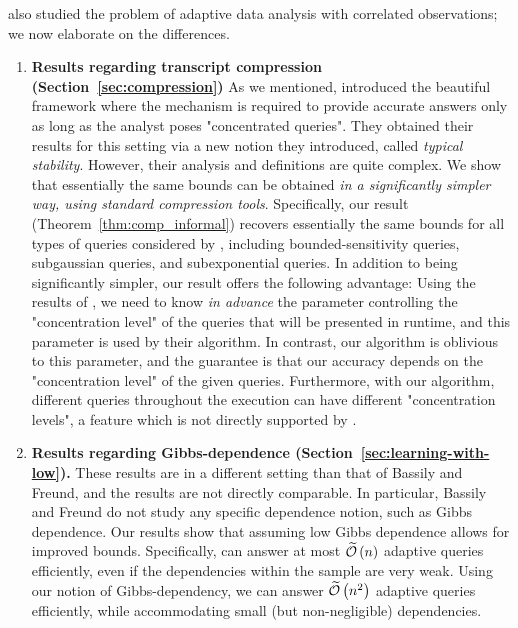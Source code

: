 \documentclass[12pt,a4paper,oneside,onecolumn]{book}
\begin{document}
\citet{DBLP:journals/corr/BassilyF16} also studied the problem of adaptive data analysis with correlated observations; we now elaborate on the differences. 
\begin{enumerate}

\item {\bf Results regarding transcript compression (Section~\ref{sec:compression})}
As we mentioned,  \citet{DBLP:journals/corr/BassilyF16} introduced the beautiful framework where the mechanism is required to provide accurate answers only as long as the analyst poses "concentrated queries". They obtained their results for this setting via a new notion they introduced, called {\em typical stability}. However, their analysis and definitions are quite complex. We show that essentially the same bounds can be obtained {\em in a significantly simpler way, using standard compression tools}. Specifically, our result (Theorem~\ref{thm:comp_informal}) recovers essentially the same bounds for all types of queries considered by  \citet{DBLP:journals/corr/BassilyF16}, including bounded-sensitivity queries, subgaussian queries, and subexponential queries. In addition to being significantly simpler, our result offers the following advantage: Using the results of \citet{DBLP:journals/corr/BassilyF16}, we need to know {\em in advance} the parameter controlling the "concentration level"  of the queries that will be presented in runtime, and this parameter is used by their algorithm. In contrast, our algorithm is oblivious to this parameter, and the guarantee is that our accuracy depends on the "concentration level" of the given queries. Furthermore, with our algorithm, different queries throughout the execution can have different "concentration levels", a feature which is not directly supported by \citet{DBLP:journals/corr/BassilyF16}.


    \item 
    {\bf Results regarding Gibbs-dependence (Section~\ref{sec:learning-with-low}).}
    These results are in a different setting than that of Bassily and Freund, and the results are not directly comparable. In particular, Bassily and Freund do not study any specific dependence notion, such as Gibbs dependence. Our results show that assuming low Gibbs dependence allows for improved bounds. Specifically, \citet{DBLP:journals/corr/BassilyF16} can answer at most $\widetilde{\mathcal{O}}\left(n\right)$ adaptive queries efficiently, even if the dependencies within the sample are very weak. Using our notion of Gibbs-dependency, we can answer $\widetilde{\mathcal{O}}\left(n^2\right)$ adaptive queries efficiently, while accommodating small (but non-negligible) dependencies.
\end{enumerate}
\end{document}
